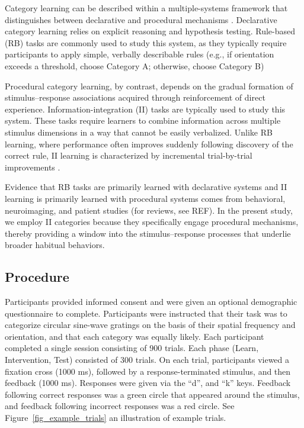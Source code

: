 \documentclass{article}
\begin{document}
Category learning can be described within a multiple-systems
framework that distinguishes between declarative and
procedural mechanisms \cite{ashby1998differentiating,
ashby2017multiple}.  Declarative category learning relies on
explicit reasoning and hypothesis testing. Rule-based (RB)
tasks are commonly used to study this system, as they
typically require participants to apply simple, verbally
describable rules (e.g., if orientation exceeds a threshold,
choose Category A; otherwise, choose Category B)

Procedural category learning, by contrast, depends on the
gradual formation of stimulus--response associations
acquired through reinforcement of direct experience.
Information-integration (II) tasks are typically used to
study this system. These tasks require learners to combine
information across multiple stimulus dimensions in a way
that cannot be easily verbalized. Unlike RB learning, where
performance often improves suddenly following discovery of
the correct rule, II learning is characterized by
incremental trial-by-trial improvements
\cite{maddox2004dissociating, ashby2011}.

Evidence that RB tasks are primarily learned with
declarative systems and II learning is primarily learned
with procedural systems comes from behavioral, neuroimaging,
and patient studies (for reviews, see REF). In the present
study, we employ II categories because they specifically
engage procedural mechanisms, thereby providing a window
into the stimulus--response processes that underlie broader
habitual behaviors.

\subsection{Procedure}
Participants provided informed consent and were given an
optional demographic questionnaire to complete. Participants
were instructed that their task was to categorize circular
sine-wave gratings on the basis of their spatial frequency
and orientation, and that each category was equally likely.
Each participant completed a single session consisting of
900 trials. Each phase (Learn, Intervention, Test) consisted
of 300 trials. On each trial, participants viewed a fixation
cross (1000 ms), followed by a response-terminated stimulus,
and then feedback (1000 ms).  Responses were given via the
``d'', and ``k'' keys.  Feedback following correct responses
was a green circle that appeared around the stimulus, and
feedback following incorrect responses was a red circle. See
Figure~\ref{fig_example_trials} an illustration of example
trials.
\end{document}
